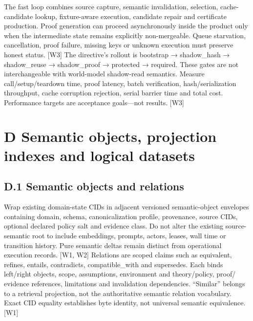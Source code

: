 The fast loop combines source capture, semantic invalidation, selection, cache-candidate lookup,
fixture-aware execution, candidate repair and certificate production. Proof generation can proceed
asynchronously inside the product only when the intermediate state remains explicitly non-mergeable.
Queue starvation, cancellation, proof failure, missing keys or unknown execution must preserve
honest status. [W3]
The directive’s rollout is bootstrap → shadow\_hash → shadow\_reuse → shadow\_proof → protected
→ required. These gates are not interchangeable with world-model shadow-read semantics. Measure
call/setup/teardown time, proof latency, batch verification, hash/serialization throughput, cache
corruption rejection, serial barrier time and total cost. Performance targets are acceptance goals—not
results. [W3]


\section*{D Semantic objects, projection indexes and logical datasets}
\subsection*{D.1 Semantic objects and relations}

Wrap existing domain-state CIDs in adjacent versioned semantic-object envelopes containing domain,
schema, canonicalization profile, provenance, source CIDs, optional declared policy salt and evidence
class. Do not alter the existing source-semantic root to include embeddings, prompts, actors, leases,
wall time or transition history. Pure semantic deltas remain distinct from operational execution
records. [W1, W2]
Relations are scoped claims such as equivalent, refines, entails, contradicts, compatible\_with and
supersedes. Each binds left/right objects, scope, assumptions, environment and theory/policy, proof/
evidence references, limitations and invalidation dependencies. “Similar” belongs to a retrieval
projection, not the authoritative semantic relation vocabulary. Exact CID equality establishes byte
identity, not universal semantic equivalence. [W1]


